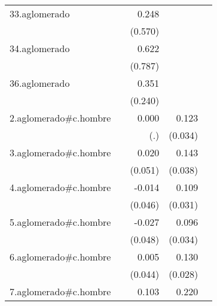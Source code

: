 {\begin{longtable}{l*{4}{D{.}{.}{-1}}}
\addlinespace
33.aglomerado&                     &       0.248         &                     &                     \\
            &                     &     (0.570)         &                     &                     \\
\addlinespace
34.aglomerado&                     &       0.622         &                     &                     \\
            &                     &     (0.787)         &                     &                     \\
\addlinespace
36.aglomerado&                     &       0.351         &                     &                     \\
            &                     &     (0.240)         &                     &                     \\
\addlinespace
2.aglomerado#c.hombre&                     &       0.000         &       0.123\sym{***}&                     \\
            &                     &         (.)         &     (0.034)         &                     \\
\addlinespace
3.aglomerado#c.hombre&                     &       0.020         &       0.143\sym{***}&                     \\
            &                     &     (0.051)         &     (0.038)         &                     \\
\addlinespace
4.aglomerado#c.hombre&                     &      -0.014         &       0.109\sym{***}&                     \\
            &                     &     (0.046)         &     (0.031)         &                     \\
\addlinespace
5.aglomerado#c.hombre&                     &      -0.027         &       0.096\sym{**} &                     \\
            &                     &     (0.048)         &     (0.034)         &                     \\
\addlinespace
6.aglomerado#c.hombre&                     &       0.005         &       0.130\sym{***}&                     \\
            &                     &     (0.044)         &     (0.028)         &                     \\
\addlinespace
7.aglomerado#c.hombre&                     &       0.103\sym{*}  &       0.220\sym{***}&                     \\

\end{longtable}}
